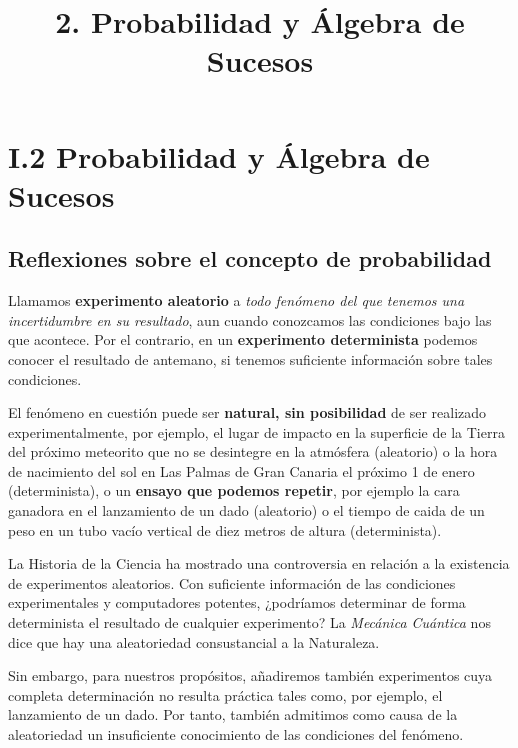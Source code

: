 \documentclass[11pt]{article}
\title{2. Probabilidad y Álgebra de Sucesos}
\begin{document}
    
    
    \maketitle
    
    

    
    \section*{I.2 Probabilidad y Álgebra de
Sucesos}\label{i.2-probabilidad-y-uxe1lgebra-de-sucesos}

\subsection*{Reflexiones sobre el concepto de
probabilidad}\label{reflexiones-sobre-el-concepto-de-probabilidad}

Llamamos \textbf{experimento aleatorio} a \emph{todo fenómeno del que
tenemos una incertidumbre en su resultado}, aun cuando conozcamos las
condiciones bajo las que acontece. Por el contrario, en un
\textbf{experimento determinista} podemos conocer el resultado de
antemano, si tenemos suficiente información sobre tales condiciones.

El fenómeno en cuestión puede ser \textbf{natural, sin posibilidad} de
ser realizado experimentalmente, por ejemplo, el lugar de impacto en la
superficie de la Tierra del próximo meteorito que no se desintegre en la
atmósfera (aleatorio) o la hora de nacimiento del sol en Las Palmas de
Gran Canaria el próximo 1 de enero (determinista), o un \textbf{ensayo
que podemos repetir}, por ejemplo la cara ganadora en el lanzamiento de
un dado (aleatorio) o el tiempo de caida de un peso en un tubo vacío
vertical de diez metros de altura (determinista).

    La Historia de la Ciencia ha mostrado una controversia en relación a la
existencia de experimentos aleatorios. Con suficiente información de las
condiciones experimentales y computadores potentes, ¿podríamos
determinar de forma determinista el resultado de cualquier experimento?
La \emph{Mecánica Cuántica} nos dice que hay una aleatoriedad
consustancial a la Naturaleza.

Sin embargo, para nuestros propósitos, añadiremos también experimentos
cuya completa determinación no resulta práctica tales como, por ejemplo,
el lanzamiento de un dado. Por tanto, también admitimos como causa de la
aleatoriedad un insuficiente conocimiento de las condiciones del
fenómeno.
\end{document}
